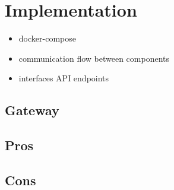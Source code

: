 \chapter{Implementation}

\begin{itemize}
	\item docker-compose
	\item communication flow between components
	\item interfaces API endpoints
\end{itemize}

\section{Gateway}

\section{Pros}

\section{Cons}
